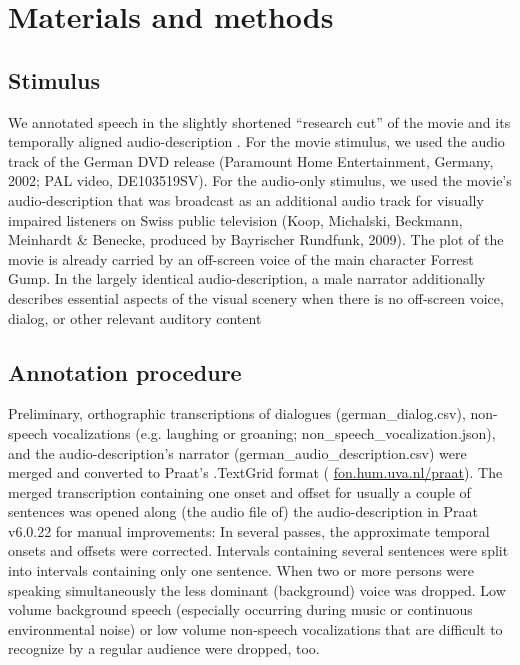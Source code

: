 \documentclass[10pt,a4paper,onecolumn]{article}
\begin{document}
\section*{Materials and methods}
\subsection*{Stimulus}
We annotated speech in the slightly shortened ``research cut'' of the movie
\citep{hanke2016simultaneous} and its temporally aligned audio-description
\citep{hanke2014audiomovie}. For the movie stimulus, we used the audio track of
the German DVD release (Paramount Home Entertainment, Germany, 2002; PAL video,
DE103519SV)\citep{ForrestGumpDVD}. For the audio-only stimulus, we used the
movie's audio-description that was broadcast as an additional audio track for
visually impaired listeners on Swiss public television (Koop, Michalski,
Beckmann, Meinhardt \& Benecke, produced by Bayrischer Rundfunk,
2009)\citep{ForrestGumpGermanAD}. The plot of the movie is already carried by an
off-screen voice of the main character Forrest Gump. In the largely identical audio-description, a male narrator additionally describes essential aspects of the visual scenery when there is no off-screen voice, dialog, or other relevant auditory content
\subsection*{Annotation procedure}
Preliminary, orthographic transcriptions of dialogues (german\_dialog.csv),
non-speech vocalizations (e.g. laughing or groaning;
non\_speech\_vocalization.json), and the audio-description's narrator
(german\_audio\_description.csv) were merged and converted to Praat's
\citep{boersma2019praat} .TextGrid format (
\href{www.fon.hum.uva.nl/praat}{fon.hum.uva.nl/praat}). The merged transcription
containing one onset and offset for usually a couple of sentences was opened
along (the audio file of) the audio-description in Praat v6.0.22 for manual
improvements: In several passes, the approximate temporal onsets and offsets
were corrected. Intervals containing several sentences were split into intervals
containing only one sentence. When two or more persons were speaking
simultaneously the less dominant (background) voice was dropped. Low volume
background speech (especially occurring during music or continuous environmental
noise) or low volume non-speech vocalizations that are difficult to recognize by
a regular audience were dropped, too.
\end{document}

